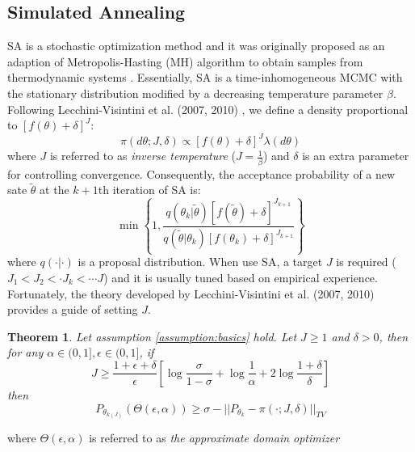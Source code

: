 \documentclass{article} %
\newtheorem{theorem}{Theorem}
\begin{document}
\subsection{Simulated Annealing}
SA is a stochastic optimization method and it was originally proposed as an adaption of Metropolis-Hasting (MH) algorithm to obtain samples 
from thermodynamic systems \cite{SA}. Essentially, SA is a time-inhomogeneous MCMC with the stationary distribution modified by a decreasing 
temperature parameter $\beta$. Following Lecchini-Visintini et al. (2007, 2010) \cite{SA_finite_time_2, SA_finite_time}, we define a density proportional   
to $[f(\theta)+\delta]^J$: 
\begin{equation}
	\pi(d\theta; J,\delta)\propto [f(\theta)+\delta]^J \lambda(d\theta)
\end{equation}
where $J$ is referred to as \emph{inverse temperature} ($J=\frac{1}{\beta}$) and $\delta$ is an extra parameter for controlling convergence. Consequently, 
the acceptance probability of a new sate $\tilde{\theta}$ at the $k+1$th iteration of SA is: 
\begin{equation}
	\min\left\{1,\frac{q(\theta_k|\tilde{\theta})[f(\tilde{\theta})+\delta]^{J_{k+1}}}{q(\tilde{\theta}|\theta_k)[f(\theta_k)+\delta]^{J_{k+1}}}\right\}
\end{equation}
where $q(\cdot|\cdot)$ is a proposal distribution. 
When use SA, a target $J$ is required ($J_1<J_2<\cdot J_k<\cdots J$) and it is usually tuned based on empirical experience. 
Fortunately, the theory developed by Lecchini-Visintini et al. (2007, 2010) 
\cite{SA_finite_time_2, SA_finite_time} provides a guide of setting $J$. 
\begin{theorem} \cite{SA_finite_time}
	\label{col:target_temperature}
Let assumption \ref{assumption:basics} hold. Let $J\geq 1$ and $\delta>0$, then for any $\alpha \in (0,1], \epsilon \in (0,1]$, if 
\begin{equation}
	J \geq \frac{1+\epsilon+\delta}{\epsilon}\left[\log\frac{\sigma}{1-\sigma}+\log \frac{1}{\alpha}+2 \log \frac{1+\delta}{\delta} \right]
	\label{equ:J_bound}
\end{equation}
then 
\begin{equation}
	P_{\theta_{k(J)}}(\Theta(\epsilon,\alpha))\geq \sigma-||P_{\theta_{k}}-\pi(\cdot; J, \delta)||_{TV}
	\label{equ:prob_bound}
\end{equation}
\label{theorem:SA}
\end{theorem}
where $\Theta(\epsilon,\alpha)$ is referred to as \emph{the approximate domain optimizer} 
\end{document}
